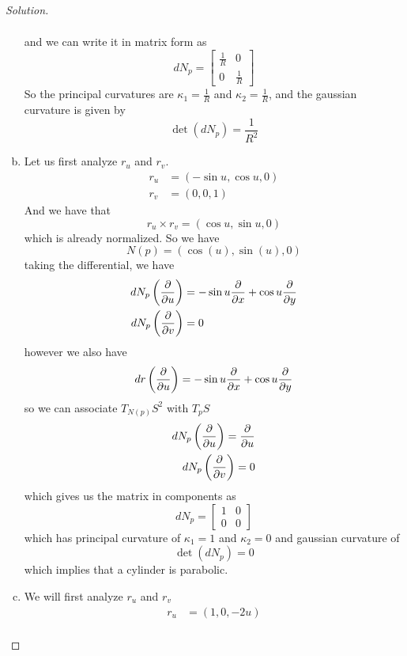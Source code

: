 \documentclass[a4paper]{article}
\begin{document}
\begin{proof}[Solution]
\begin{enumerate}[(a)]
\[\begin{aligned}
        \end{aligned}
      \]
      and we can write it in matrix form as
      \[
        dN_p =
        \begin{bmatrix}
          \frac{1}{R} & 0 \\
          0 & \frac{1}{R}
        \end{bmatrix}
      \]
      So the principal curvatures are $\kappa_1 = \frac{1}{R}$ and $\kappa_2 = \frac{1}{R}$, and the gaussian curvature is given by
      \[
        \det \left( dN_p \right) = \frac{1}{R^2}
      \]
    \item Let us first analyze $r_u$ and $r_v$.
      \[
        \begin{aligned}
          r_u &= (-\sin u, \cos u, 0) \\
          r_v &= (0, 0, 1)
        \end{aligned}
      \]
      And we have that
      \[
        r_u \times r_v = (\cos u, \sin u, 0)
      \]
      which is already normalized. So we have
      \[
        N(p) = (\cos(u), \sin(u), 0)
      \]
      taking the differential, we have
      \[
        \begin{aligned}
          dN_p \left( \pdv{u} \right) &= -\sin u  \pdv{x} + \cos u \pdv{y} \\
          dN_p \left( \pdv{v} \right) &= 0
        \end{aligned}
      \]
      however we also have
      \[
        dr \left( \pdv{u} \right) = -\sin u \pdv{x} + \cos u \pdv{y}
      \]
      so we can associate $T_{N(p)}S^2$ with $T_pS$
      \[
        \begin{aligned}
        dN_p \left( \pdv{u}  \right) = \pdv{u} \\
        dN_p \left( \pdv{v} \right) = 0
        \end{aligned}
      \]
      which gives us the matrix in components as
      \[
        dN_p = 
        \begin{bmatrix}
          1 & 0 \\
          0 & 0
        \end{bmatrix}
      \]
      which has principal curvature of $\kappa_1 = 1$ and $\kappa_2 = 0$ and gaussian curvature of 
      \[
        \det \left(dN_p\right) =  0
      \]
      which implies that a cylinder is parabolic.
    \item We will first analyze $r_u$ and $r_v$
      \[
        \begin{aligned}
          r_u &= (1, 0, -2u) \\

\end{aligned}\]
\end{enumerate}
\end{proof}
\end{document}
